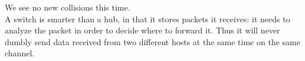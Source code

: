 We see no new collisions this time. \\
A switch is smarter than a hub, in that it stores packets it receives: it needs to analyze
the packet in order to decide where to forward it. Thus it will never dumbly send data
received from two different hosts at the same time on the same channel.

